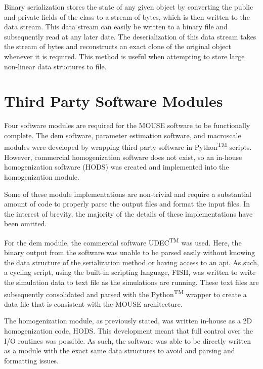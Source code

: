 Binary serialization stores the state of any given object by converting the public and private fields of the class to a stream of bytes, which is then written to the data stream. This data stream can easily be written to a binary file and subsequently read at any later date. The deserialization of this data stream takes the stream of bytes and reconstructs an exact clone of the original object whenever it is required. This method is useful when attempting to store large non-linear data structures to file.


\section{Third Party Software Modules}

Four software modules are required for the MOUSE software to be functionally complete. The \acrshort{dem} software, parameter estimation software, and macroscale modules were developed by wrapping third-party software in Python\textsuperscript{TM} scripts. However, commercial homogenization software does not exist, so an in-house homogenization software (HODS) was created and implemented into the homogenization module.

Some of these module implementations are non-trivial and require a substantial amount of code to properly parse the output files and format the input files. In the interest of brevity, the majority of the details of these implementations have been omitted. 

For the \acrshort{dem} module, the commercial software UDEC\textsuperscript{TM} was used. Here, the binary output from the software was unable to be parsed easily without knowing the data structure of the serialization method or having access to an \acrfull{api}. As such, a cycling script, using the built-in scripting language, FISH, was written to write the simulation data to text file as the simulations are running. These text files are subsequently consolidated and parsed with the Python\textsuperscript{TM} wrapper to create a data file that is consistent with the MOUSE architecture. 

The homogenization module, as previously stated, was written in-house as a 2D homogenization code, HODS. This development meant that full control over the I/O routines was possible. As such, the software was able to be directly written as a module with the exact same data structures to avoid and parsing and formatting issues.

